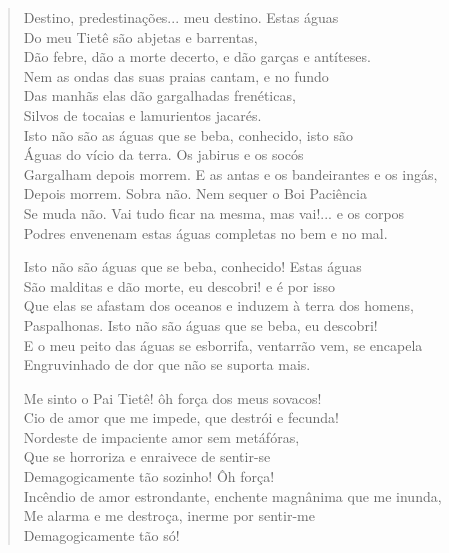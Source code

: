 \begin{verse}
Destino, predestinações... meu destino. Estas águas\\
Do meu Tietê são abjetas e barrentas,\\
Dão febre, dão a morte decerto, e dão garças e antíteses.\\
Nem as ondas das suas praias cantam, e no fundo\\
Das manhãs elas dão gargalhadas frenéticas,\\
Silvos de tocaias e lamurientos jacarés.\\
Isto não são as águas que se beba, conhecido, isto são\\
Águas do vício da terra. Os jabirus e os socós\\
Gargalham depois morrem. E as antas e os bandeirantes e os ingás,\\
Depois morrem. Sobra não. Nem sequer o Boi Paciência\\
Se muda não. Vai tudo ficar na mesma, mas vai!... e os corpos\\
Podres envenenam estas águas completas no bem e no mal.

Isto não são águas que se beba, conhecido! Estas águas\\
São malditas e dão morte, eu descobri! e é por isso\\
Que elas se afastam dos oceanos e induzem à terra dos homens,\\
Paspalhonas. Isto não são águas que se beba, eu descobri!\\
E o meu peito das águas se esborrifa, ventarrão vem, se encapela\\
Engruvinhado de dor que não se suporta mais.

Me sinto o Pai Tietê! ôh força dos meus sovacos!\\
Cio de amor que me impede, que destrói e fecunda!\\
Nordeste de impaciente amor sem metáfóras,\\
Que se horroriza e enraivece de sentir-se\\
Demagogicamente tão sozinho! Ôh força!\\
Incêndio de amor estrondante, enchente magnânima que me inunda,\\
Me alarma e me destroça, inerme por sentir-me\\
Demagogicamente tão só!


\end{verse}
